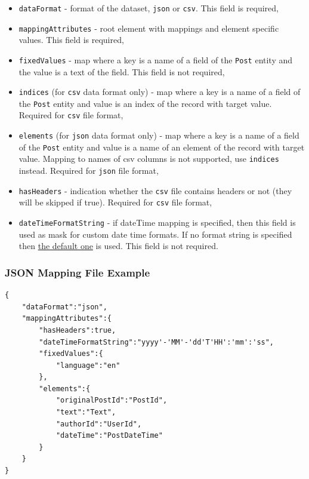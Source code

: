 \documentclass{article}
\begin{document}
\begin{itemize}
    \item \texttt{dataFormat} - format of the dataset, \texttt{json} or \texttt{csv}. This field is required,
    \item \texttt{mappingAttributes} - root element with mappings and element specific values. This field is required,
    \item \texttt{fixedValues} - map where a key is a name of a field of the \texttt{Post} entity and the value is a text of the field. This field is not required,
    \item \texttt{indices} (for \texttt{csv} data format only) - map where a key is  a name of a field of the \texttt{Post} entity and value is an index of the record with target value. Required for \texttt{csv} file format,
    \item \texttt{elements} (for \texttt{json} data format only) - map where a key is  a name of a field of the \texttt{Post} entity and value is a name of an element of the record with target value. Mapping to names of csv columns is not supported, use \texttt{indices} instead. Required for \texttt{json} file format,
    \item \texttt{hasHeaders} - indication whether the \texttt{csv} file contains headers or not (they will be skipped if true). Required for \texttt{csv} file format,
    \item \texttt{dateTimeFormatString} - if dateTime mapping is specified, then this field is used as mask for custom date time formats. If no format string is specified then \hyperref[https://docs.microsoft.com/en-us/dotnet/api/system.datetime.tryparse?view=netcore-3.1]{the default one} is used. This field is not required.
\end{itemize}

\subsubsection{JSON Mapping File Example}
\begin{lstlisting}
{
    "dataFormat":"json",
    "mappingAttributes":{
        "hasHeaders":true,
        "dateTimeFormatString":"yyyy'-'MM'-'dd'T'HH':'mm':'ss",
        "fixedValues":{
            "language":"en"
        },
        "elements":{
            "originalPostId":"PostId",
            "text":"Text",
            "authorId":"UserId",
            "dateTime":"PostDateTime"
        }
    }
}
\end{lstlisting}
\end{document}

